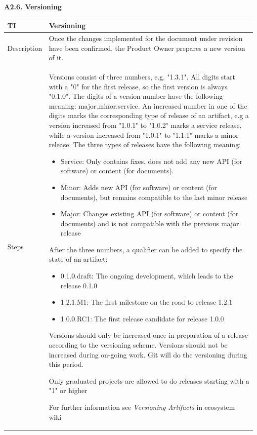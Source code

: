 \documentclass{template/openetcs_article}
\begin{document}
\textbf{A2.6. Versioning}

\begin{flushleft}
\tablefirsthead{}
\tablehead{}
\tabletail{}
\tablelasttail{}
\begin{supertabular}{|m{2cm}|m{13cm}|}
\hline
{}
TI & 
Versioning
\\\hline
Description &
Once the changes implemented for the document under revision have been confirmed, the Product Owner prepares a new version of it.
\\\hline
Steps &
Versions consist of three numbers, e.g. "1.3.1". All digits start with a "0" for the first release, so the first version is always "0.1.0". The digits of a version number have the following meaning: major.minor.service. An increased number in one of the digits marks the corresponding type of release of an artifact, e.g a version increased from "1.0.1" to "1.0.2" marks a service release, while a version increased from "1.0.1" to "1.1.1" marks a minor release. The three types of releases have the following meaning:
\begin{itemize}
\item Service: Only contains fixes, does not add any new API (for software) or content (for documents).
\item Minor: Adds new API (for software) or content (for documents), but remains compatible to the last minor release
\item Major: Changes existing API (for software) or content (for documents) and is not compatible with the previous major release
\end{itemize}
After the three numbers, a qualifier can be added to specify the state of an artifact:
\begin{itemize}
\item 0.1.0.draft: The ongoing development, which leads to the release 0.1.0
\item 1.2.1.M1: The first milestone on the road to release 1.2.1
\item 1.0.0.RC1: The first release candidate for release 1.0.0
\end{itemize}
Versions should only be increased once in preparation of a release according to the versioning scheme. Versions should not be increased during on-going work. Git will do the versioning during this period.

Only graduated projects are allowed to do releases starting with a "1" or higher

For further information see {\it Versioning Artifacts} in ecosystem wiki
\\\hline
\end{supertabular}
\end{flushleft}
\end{document}
